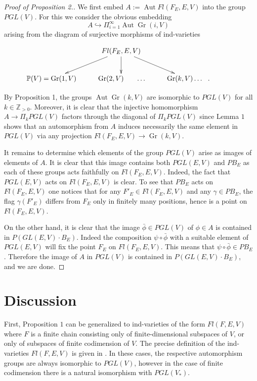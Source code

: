 \documentclass[11pt]{amsart}
\numberwithin{equation}{section}
\theoremstyle{plain}
\theoremstyle{remark}
\theoremstyle{remark}
\theoremstyle{construction}
\begin{document}
\begin{proof}[Proof of Proposition 2.] We first embed $A:=\operatorname{Aut}Fl(F_E,E,V)$ into the group $PGL(V)$. For this we consider the obvious embedding $$A\hookrightarrow\Pi_{i=1}^{\infty}\operatorname{Aut} \operatorname{Gr}(i,V)$$
arising from the diagram of surjective morphisms of ind-varieties





$$
\xymatrix{
&{}Fl(F_E,E,V)\ar[dl]\ar[d]\ar[dr]\\
\mathbb{P}(V)=\operatorname{Gr}(1,V)&{}\operatorname{Gr}(2,V)\:\:\:\:\:\:\:\:\dots&{}\operatorname{Gr}(k,V)\dots\:\:\:.&{}
}
$$

By Proposition 1, the groups $\operatorname{Aut}\operatorname{Gr}(k,V)$ are isomorphic to $PGL(V)$ for all $k\in\mathbb Z_{>0}$. Moreover, it is clear that the injective homomorphism $A\to\Pi_k PGL(V)$ factors through the diagonal of $\Pi_k PGL(V)$ since Lemma $1$ shows that an automorphism from $A$ induces necessarily the same element in $PGL(V)$ via any projection $Fl(F_E,E,V)\to\operatorname{Gr}(k,V)$.

It remains to determine which elements of the group $PGL(V)$ arise as images of elements of $A$. It is clear that this image contains both $PGL(E,V)$ and $PB_E$ as each of these groups acts faithfully on $Fl(F_E,E,V)$. Indeed, the fact that $PGL(E,V)$ acts on $Fl(F_E,E,V)$ is clear. To see that $PB_E$ acts on $Fl(F_E,E,V)$ one notices that  for any $F'_E\in Fl(F_E,E,V)$ and any $\gamma\in PB_E$, the flag $\gamma(F'_E)$ differs from $F_E$ only in finitely many positions, hence is a point on $Fl(F_E,E,V).$ 

On the other hand, it is clear that the image $\bar\phi\in PGL(V)$ of $\phi\in A$ is contained in $P(GL(E,V)\cdot B_E)$. Indeed the composition $\psi\circ\bar\phi$ with a suitable element of $PGL(E,V)$ will fix the point $F_E$ on $Fl(F_E,E,V)$. This means that $\psi\circ\bar\phi\in PB_E$. Therefore the image of $A$ in $PGL(V)$ is contained in $P(GL(E,V)\cdot B_E)$,                  and we are done.



\end{proof}
    

\section{Discussion}
 First, Proposition $1$ can be generalized to ind-varieties of the form $Fl(F,E,V)$ where $F$ is a finite chain consisting only of finite-dimensional subspaces of $V$, or only of subspaces of finite codimension of $V$. The precise definition of the ind-varieties $Fl(F,E,V)$ is given in \cite{DP}. In these cases, the respective automorphism groups are always isomorphic to $PGL(V)$, however in the case of finite codimension there is a natural isomorphism with $PGL(V_*)$.
\end{document}
